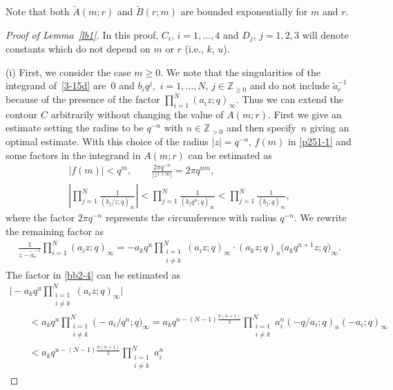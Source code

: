 \documentclass[11pt]{article}
\numberwithin{equation}{section}
\numberwithin{equation}{section}
\def\i{\infty}
\def\Z{\mathbb{Z}}
\begin{document}
 Note that
 both $\tilde{A}(m;r)$ and $\tilde{B}(r;m)$ are bounded exponentially for $m$ and $r$.

\begin{proof}[Proof of Lemma~\ref{lb1}]
In this proof, $C_i$, $i=1,\dots,4$ and $D_j$, $j=1,2,3$ will denote constants which do not depend on $m$ or $r$ (i.e., $k$, $u$).

(i) First, we consider the case $m\ge 0$.
We note that the singularities of the integrand of~\eqref{3-15d} are~$0$ and $b_iq^j,$ $i=1,\dots,N$, $j\in\Z_{\ge0}$ and do not include $\tilde{a}_r^{-1}$
because of the presence of the factor $\prod_{i=1}^N(a_iz;q)_{\i}$. Thus we can extend the contour $C$ arbitrarily without changing
the value of $A(m;r)$. First we give an estimate setting the radius to be $q^{-n}$ with $n\in\Z_{>0}$ and then specify~$n$ giving an optimal estimate. With this choice of the radius $|z|=q^{-n}$, $f(m)$ in \eqref{p251-1} and some factors in the integrand in $A(m;r)$
can be estimated as
\begin{gather}
 |f(m)|<q^m,
\qquad
 \frac{2\pi q^{-n}}{|z^{1+m}|}=2\pi q^{n m},\nonumber
\\
 \left|\prod_{j=1}^N\frac{1}{(b_j/z;q)_{\i}}\right|
 <\prod_{j=1}^N\frac{1}{(b_j q^n;q)_{\i}}
 <\prod_{j=1}^N\frac{1}{(b_j;q)_{\i}},\label{bb2-3}
\end{gather}
where the factor $2\pi q^{-n}$ represents
the circumference with radius $q^{-n}$.
We rewrite the remaining factor as
\begin{align}
\label{bb2-4}
 \frac{1}{z-\tilde{a}_{r}^{-1}}
 \prod_{i=1}^N(a_i z;q)_{\i}
 =
 -a_k q^{u}
 \prod_{\substack{i=1\\i\neq k}}^N(a_i z;q)_{\i}
 \cdot (a_k z;q)_{u} \big(a_k q^{u+1}z;q\big)_{\i}.
\end{align}
The factor \smash{$-a_kq^u\prod_{\substack{i=1\\i\neq k}}^N(a_i z;q)_{\i}$} in \eqref{bb2-4} can be estimated as
\begin{gather}
 \Biggl|-a_kq^u\prod_{\substack{i=1\\i\neq k}}^N(a_i z;q)_{\i}\Biggr|\nonumber\\
\qquad < a_kq^u\prod_{\substack{i=1\\i\neq k}}^N\bigl(-a_i/q^n ;q\bigr)_{\i}
 =a_k
 q^{u-(N-1)\frac{n(n+1)}{2}}
 \prod_{\substack{i=1\\i\neq k}}^N a_i^n
 (-q/a_i;q)_n(-a_i;q)_\i
 \nonumber\\
\qquad <a_k
 q^{u-(N-1)\frac{n(n+1)}{2}}
 \prod_{\substack{i=1\\i\neq k}}^N a_i^n

\end{gather}
\end{proof}
\end{document}
